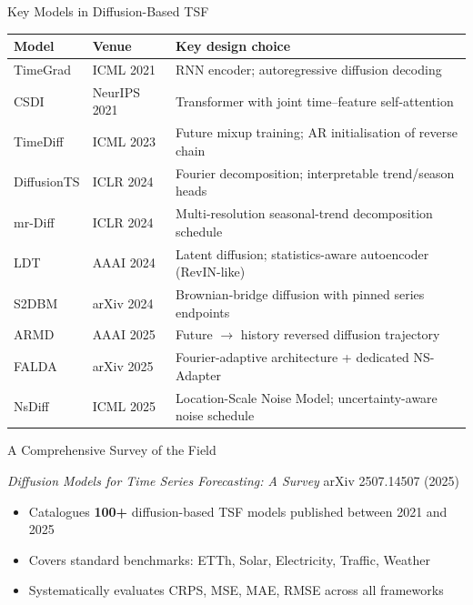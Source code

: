 \documentclass[aspectratio=169,11pt]{beamer}
\begin{document}
\begin{frame}{Key Models in Diffusion-Based TSF}
  \begin{center}
  {\small
  \renewcommand{\arraystretch}{1.0}
  \begin{tabular}{@{}llp{9.5cm}@{}}
    \toprule
    \textbf{Model} & \textbf{Venue} & \textbf{Key design choice} \\
    \midrule
    TimeGrad    & ICML 2021    & RNN encoder; autoregressive diffusion decoding \\
    CSDI        & NeurIPS 2021 & Transformer with joint time–feature self-attention \\
    TimeDiff    & ICML 2023    & Future mixup training; AR initialisation of reverse chain \\
    DiffusionTS & ICLR 2024   & Fourier decomposition; interpretable trend/season heads \\
    mr-Diff     & ICLR 2024   & Multi-resolution seasonal-trend decomposition schedule \\
    LDT         & AAAI 2024   & Latent diffusion; statistics-aware autoencoder (RevIN-like) \\
    S2DBM       & arXiv 2024  & Brownian-bridge diffusion with pinned series endpoints \\
    ARMD        & AAAI 2025   & Future $\!\to\!$ history reversed diffusion trajectory \\
    FALDA       & arXiv 2025  & Fourier-adaptive architecture + dedicated NS-Adapter \\
    NsDiff      & ICML 2025   & Location-Scale Noise Model; uncertainty-aware noise schedule \\
    \bottomrule
  \end{tabular}
  }
  \end{center}
\end{frame}

\begin{frame}{A Comprehensive Survey of the Field}
  \begin{block}{\textit{Diffusion Models for Time Series Forecasting: A Survey}}
    arXiv 2507.14507 \quad (2025)
    \vspace{6pt}
    \begin{itemize}
      \setlength\itemsep{5pt}
      \item Catalogues \textbf{100+} diffusion-based TSF models
            published between 2021 and 2025
      \item Covers standard benchmarks: ETTh, Solar,
            Electricity, Traffic, Weather
      \item Systematically evaluates CRPS, MSE, MAE,
            RMSE across all frameworks
    \end{itemize}
  \end{block}
\end{frame}
\end{document}
